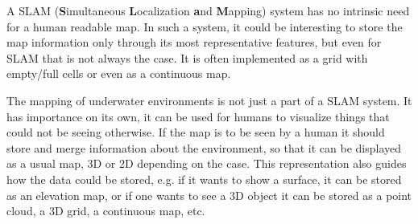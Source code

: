 A SLAM (\textbf{S}imultaneous \textbf{L}ocalization \textbf{a}nd
\textbf{M}apping) system has no intrinsic need for a human readable map.
In such a system, it could be interesting to store the map information only
through its most representative features, but even for SLAM that is not always
the case. It is often implemented as a grid with empty/full cells or even as a
continuous map.

The mapping of underwater environments is not just a part of a SLAM system. It
has importance on its own, it can be used for humans to visualize things that
could not be seeing otherwise. If the map is to be seen by a human it should
store and merge information about the environment, so that it can be displayed
as a usual map, 3D or 2D depending on the case. This representation also guides
how the data could be stored, e.g. if it wants to show a surface, it can be
stored as an elevation map, or if one wants to see a 3D object it can be stored
as a point cloud, a 3D grid, a continuous map, etc.







